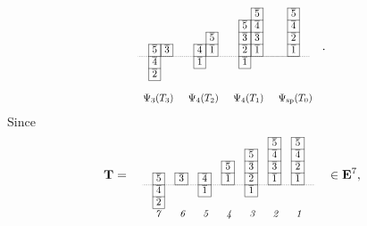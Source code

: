 \documentclass[leqno,11pt]{amsart}
\numberwithin{equation}{section}
\newcommand{\ov}{\overline}
\begin{document}
$$
\resizebox{.4\hsize}{!}
{\def\lr#1{\multicolumn{1}{|@{\hspace{.75ex}}c@{\hspace{.75ex}}|}{\raisebox{-.04ex}{$#1$}}}\raisebox{-.6ex}
{$\begin{array}{cccccccccccccccc}
\\
\cline{11-11}\cline{14-14}
& & & & & & & & &  & \lr{\ov{5}} & & & \lr{\ov{5}} &   \\
\cline{10-11}\cline{14-14}
& & & & & & & & & \lr{\ov{5}} & \lr{\ov{4}} & & & \lr{\ov{4}} &   \\
\cline{7-7}\cline{10-10}\cline{11-11}\cline{14-14}
& & & & & &  \lr{\ov{5}} & &  & \lr{\ov{3}}&\lr{\ov{3}} & & & \lr{\ov{2}} & \\
\cline{2-3}\cline{6-7}\cline{10-11}\cline{14-14} 
&\lr{\ov{5}} & \lr{\ov{3}}& & & \lr{\ov{4}} & \lr{\ov{1}} & & & \lr{\ov{2}} & \lr{\ov{1}}& & & \lr{\ov{1}} &   \\
\cline{2-3}\cdashline{1-5}[0.5pt/1pt]\cline{6-7}\cdashline{8-15}[0.5pt/1pt]
\cline{10-11}\cdashline{12-14}[0.5pt/1pt]\cline{14-14}
&\lr{\ov{4}} & & & & \lr{\ov{1}} & & &  & \lr{\ov{1}} & & & & & \\
\cline{2-2}\cline{6-6}\cline{10-10}
&\lr{\ov{2}} & & & & & \\
\cline{2-2}
\\
\Psi_3(T_3)\!\!\!\!\!\!\!\!\!\!\!\!\!\!\!\!\!\! & & & & 
\Psi_4(T_2)\!\!\!\!\!\!\!\!\!\!\!\!\!\!\!\!\!\! & & & & 
\Psi_4(T_1)\!\!\!\!\!\!\!\!\!\!\!\!\!\!\!\!\!\! & & & & 
\Psi_{\rm sp}(T_0)\!\!\!\!\!\!\!\!\!\!\!\!\!\!\!\!\!\! 
\end{array}$}} \quad .
$$ 
Since
$$
{\bf T}=\quad 
\resizebox{.4\hsize}{!}
{\def\lr#1{\multicolumn{1}{|@{\hspace{.75ex}}c@{\hspace{.75ex}}|}{\raisebox{-.04ex}{$#1$}}}\raisebox{-.6ex}
{$\begin{array}{cccccccccccccccccccc}
\cline{12-12}\cline{14-14} 
& & & & & & & & & & & \lr{\ov{5}} & & \lr{\ov{5}} &   \\
\cline{10-10}\cline{12-12}\cline{14-14} 
& & & & & & & & & \lr{\ov 5} & & \lr{\ov 4} & & \lr{\ov{4}} &   \\
\cline{8-8}\cline{10-10}\cline{12-12}\cline{14-14} 
& & & & & & & \lr{\ov{5}} &  & \lr{\ov{3}}& & \lr{\ov{3}} & & \lr{\ov{2}} &   \\
\cline{2-2}\cline{4-4}\cline{6-6}\cline{8-8}\cline{10-10}\cline{12-12}\cline{14-14} 
&\lr{\ov{5}} & & \lr{\ov{3}}  & & \lr{\ov{4}} & & \lr{\ov{1}} & & \lr{\ov{2}}& & \lr{\ov{1}}& & \lr{\ov{1}} &   \\
\cline{2-2}\cline{4-4}\cline{6-6}\cline{8-8}
\cline{10-10}\cline{12-12}\cdashline{1-15}[0.5pt/1pt]\cline{14-14} 
&\lr{\ov{4}} & & & & \lr{\ov{1}} & & &  & \lr{\ov{1}} & & & &   \\
\cline{2-2}\cline{6-6}\cline{10-10} 
&\lr{\ov{2}} & & & &   \\
\cline{2-2}
&\!\!\text{\em 7\!} & &\text{\em 6\!} & &\text{\em 5\!} & &\text{\em 4\!} & &\text{\em 3\!} & &\text{\em 2\!} & &\text{\em 1\!} 
\end{array}$}} \quad  \in {\bf E}^7,
$$ 
\end{document}
